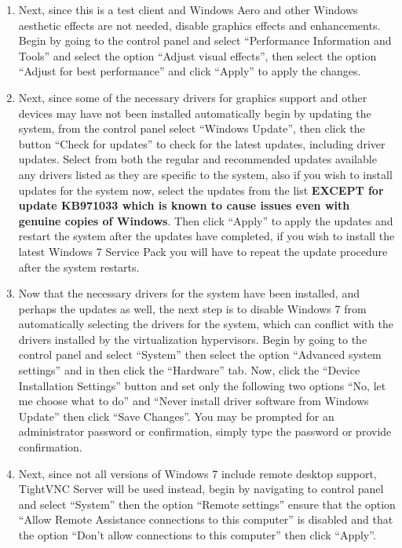 \begin{enumerate}
\item	Next, since this is a test client and Windows Aero and other Windows aesthetic effects are not needed, disable graphics effects and
		enhancements. Begin by going to the control panel and select ``Performance Information and Tools'' and select the option ``Adjust
		visual effects'', then select the option ``Adjust for best performance'' and click ``Apply'' to apply the changes.
		
\item	Next, since some of the necessary drivers for graphics support and other devices may have not been installed automatically begin
		by updating the system, from the control panel select ``Windows Update'', then click the button ``Check for updates'' to check
		for the latest updates, including driver updates. Select from both the regular and recommended updates available any drivers
		listed as they are specific to the system, also if you wish to install updates for the system now, select the updates from the
		list {\bf EXCEPT for update KB971033 which is known to cause issues even with genuine copies of Windows}. Then click ``Apply'' 
		to apply the updates and restart the system after the updates have completed, if you wish to install the latest Windows 7 Service
		Pack you will have to repeat the update procedure after the system restarts.
		
\item	Now that the necessary drivers for the system have been installed, and perhaps the updates as well, the next step is to disable
		Windows 7 from automatically selecting the drivers for the system, which can conflict with the drivers installed by the
		virtualization hypervisors. Begin by going to the control panel and select ``System'' then select the option ``Advanced
		system settings'' and in then click the ``Hardware'' tab. Now, click the ``Device Installation Settings'' button and
		set only the following two options ``No, let me choose what to do'' and ``Never install driver software from Windows
		Update'' then click ``Save Changes''. You may be prompted for an administrator password or confirmation, simply 
		type the password or provide confirmation.
		
		
\item	Next, since not all versions of Windows 7 include remote desktop support, TightVNC Server will be used instead, begin
		by navigating to control panel and select ``System'' then the option ``Remote settings'' ensure that the option
		``Allow Remote Assistance connections to this computer'' is disabled and that the option ``Don't allow connections
		to this computer'' then click ``Apply''.
		

\end{enumerate}
